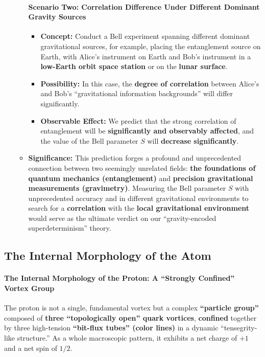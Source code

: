 \documentclass[11pt, a4paper]{article}
\begin{document}
\begin{itemize}
\begin{itemize}
        \paragraph{Scenario Two: Correlation Difference Under Different Dominant Gravity Sources}
        \begin{itemize}
            \item \textbf{Concept:} Conduct a Bell experiment spanning different dominant gravitational sources, for example, placing the entanglement source on Earth, with Alice's instrument on Earth and Bob's instrument in a \textbf{low-Earth orbit space station} or on the \textbf{lunar surface}.
            \item \textbf{Possibility:} In this case, the \textbf{degree of correlation} between Alice's and Bob's ``gravitational information backgrounds'' will differ significantly.
            \item \textbf{Observable Effect:} We predict that the strong correlation of entanglement will be \textbf{significantly and observably affected}, and the value of the Bell parameter $S$ will \textbf{decrease significantly}.
        \end{itemize}

        \item \textbf{Significance:}
        This prediction forges a profound and unprecedented connection between two seemingly unrelated fields: \textbf{the foundations of quantum mechanics (entanglement)} and \textbf{precision gravitational measurements (gravimetry)}. Measuring the Bell parameter $S$ with unprecedented accuracy and in different gravitational environments to search for a \textbf{correlation} with the \textbf{local gravitational environment} would serve as the ultimate verdict on our ``gravity-encoded superdeterminism'' theory.
    \end{itemize}
\end{itemize}

\subsection{The Internal Morphology of the Atom}

\paragraph{The Internal Morphology of the Proton: A ``Strongly Confined'' Vortex Group}

The proton is not a single, fundamental vortex but a complex \textbf{``particle group''} composed of \textbf{three ``topologically open'' quark vortices}, \textbf{confined} together by three high-tension \textbf{``bit-flux tubes'' (color lines)} in a dynamic ``tensegrity-like structure.'' As a whole macroscopic pattern, it exhibits a net charge of $+1$ and a net spin of $1/2$.
\end{document}
